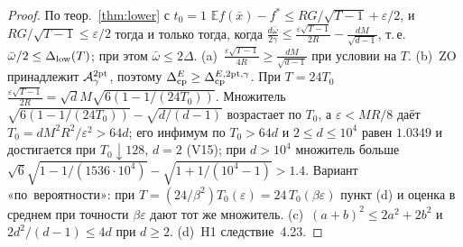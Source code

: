 \documentclass[11pt,a4paper]{article}
\numberwithin{equation}{section}
\theoremstyle{definition}
\theoremstyle{remark}
\newcommand{\E}{\mathbb E}\newcommand{\R}{\mathbb R}\newcommand{\Z}{\mathbb Z}\let\Prob\relax\newcommand{\Prob}{\mathbb P}
\newcommand{\wbar}{\bar\omega}\newcommand{\Atwo}{\cA^{\rm 2pt}_\gamma}
\begin{document}
\begin{proof}
По теор.~\ref{thm:lower} с $t_0=1$ $\E f(\bar x)-f^*\le RG/\sqrt{T-1}+\varepsilon/2$, и $RG/\sqrt{T-1}\le\varepsilon/2$ тогда и только тогда, когда $\frac{d\wbar}{2\gamma}\le\frac{\varepsilon\sqrt{T-1}}{2R}-\frac{dM}{\sqrt{d-1}}$, т.\,е.\ $\wbar/2\le\Dlow(T)$; при этом $\wbar\le2\Delta$. (a)~$\frac{\varepsilon\sqrt{T-1}}{4R}\ge\frac{dM}{\sqrt{d-1}}$ при условии на $T$. (b)~ZO принадлежит $\Atwo$, поэтому $\Delta_{\rm cp}^E\ge\Delta_{\rm cp}^{E,\mathrm{2pt},\gamma}$. При $T=24T_0$ $\frac{\varepsilon\sqrt{T-1}}{2R}=\sqrt dM\sqrt{6(1-1/(24T_0))}$. Множитель $\sqrt{6(1-1/(24T_0))}-\sqrt{d/(d-1)}$ возрастает по $T_0$, а $\varepsilon<MR/8$ даёт $T_0=dM^2R^2/\varepsilon^2>64d$; его инфимум по $T_0>64d$ и $2\le d\le10^4$ равен $1.0349$ и достигается при $T_0\downarrow128$, $d=2$ (V15); при $d>10^4$ множитель больше $\sqrt6\sqrt{1-1/(1536\cdot10^4)}-\sqrt{1+1/(10^4-1)}>1.4$. Вариант «по~вероятности»: при $T=(24/\beta^2)T_0(\varepsilon)=24\,T_0(\beta\varepsilon)$ пункт (d) и оценка в среднем при точности $\beta\varepsilon$ дают тот же множитель. (c)~$(a+b)^2\le2a^2+2b^2$ и $2d^2/(d-1)\le4d$ при $d\ge2$. (d)~H1 следствие~4.23.
\end{proof}
\end{document}
